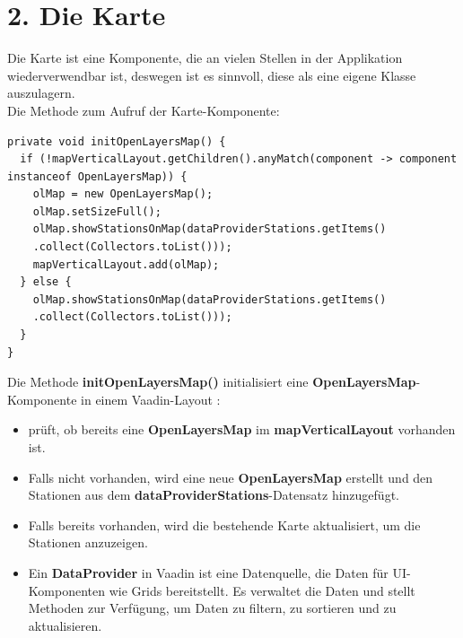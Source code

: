 \documentclass[a4paper,12pt]{scrreprt}
\begin{document}
\section*{\small \textbf{2. Die Karte}}
Die Karte ist eine Komponente, die an vielen Stellen in der Applikation wiederverwendbar ist, deswegen ist es sinnvoll, diese als eine eigene Klasse auszulagern.\\
Die Methode zum Aufruf der Karte-Komponente:
\begin{lstlisting}
private void initOpenLayersMap() {
  if (!mapVerticalLayout.getChildren().anyMatch(component -> component instanceof OpenLayersMap)) {
	olMap = new OpenLayersMap();
	olMap.setSizeFull();
	olMap.showStationsOnMap(dataProviderStations.getItems()
	.collect(Collectors.toList()));
    mapVerticalLayout.add(olMap);
  } else {
	olMap.showStationsOnMap(dataProviderStations.getItems()
	.collect(Collectors.toList()));
  }
}
\end{lstlisting}
Die Methode \textbf{initOpenLayersMap()} initialisiert eine \textbf{OpenLayersMap}-Komponente in einem Vaadin-Layout :
\begin{itemize}
\item prüft, ob bereits eine \textbf{OpenLayersMap} im \textbf{mapVerticalLayout} vorhanden ist.
\item Falls nicht vorhanden, wird eine neue  \textbf{OpenLayersMap} erstellt und den Stationen aus dem  \textbf{dataProviderStations}-Datensatz hinzugefügt.
\item Falls bereits vorhanden, wird die bestehende Karte aktualisiert, um die Stationen anzuzeigen.
\item Ein \textbf{DataProvider} in Vaadin ist eine Datenquelle, die Daten für UI-Komponenten wie Grids bereitstellt. Es verwaltet die Daten und stellt Methoden zur Verfügung, um Daten zu filtern, zu sortieren und zu aktualisieren.
\end{itemize}
\end{document}
